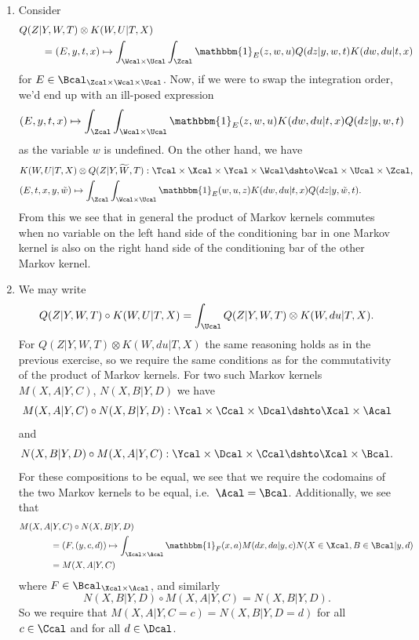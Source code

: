 \begin{enumerate}
\begin{ungradedsolution}
\begin{enumerate}
      \item Consider
      \begin{align*}
        Q(Z | & Y, W, T) \otimes K(W, U|T, X)                                                                                     \\
              & = (E, y, t, x) \mapsto \int_{\Wcal\times \Ucal}\int_{\Zcal} \mathbbm{1}_{E}(z, w, u)Q(dz | y,w, t)K(dw, du| t, x)
      \end{align*}
      for $E \in \Bcal_{\Zcal\times\Wcal\times\Ucal}$. Now, if we were to swap the integration order, we'd end up with an ill-posed expression
      \begin{align*}
        (E, y, t, x) \mapsto \int_{\Zcal}\int_{\Wcal\times \Ucal} \mathbbm{1}_{E}(z, w, u)K(dw, du| t, x) Q(dz | y,w, t)
      \end{align*}
      as the variable $w$ is undefined. On the other hand, we have
      \begin{align*}
         & K(W, U|T, X) \otimes Q(Z | Y, \widetilde{W}, T) : \Tcal \times \Xcal \times \Ycal \times \Wcal \dshto \Wcal \times \Ucal \times \Zcal, \\
         & (E, t, x, y, \tilde{w}) \mapsto \int_{\Zcal}\int_{\Wcal\times \Ucal} \mathbbm{1}_{E}(w, u, z)K(dw, du|t, x)Q(dz|y, \tilde{w}, t).
      \end{align*}
      From this we see that in general the product of Markov kernels commutes when no variable on the left hand side of the conditioning bar in one Markov kernel is also on the right hand side of the conditioning bar of the other Markov kernel.
      \item We may write
      $$Q(Z | Y, W, T) \circ K(W, U|T, X) = \int_\Ucal Q(Z | Y, W, T) \otimes K(W, du|T, X).$$ For $Q(Z | Y, W, T) \otimes K(W, du|T, X)$ the same reasoning holds as in the previous exercise, so we require the same conditions as for the commutativity of the product of Markov kernels. For two such Markov kernels $M(X, A| Y, C)$, $N(X, B| Y, D)$ we have
      $$M(X, A| Y, C) \circ N(X, B| Y, D): \Ycal \times \Ccal \times \Dcal \dshto \Xcal \times \Acal$$
      and
      $$N(X, B| Y, D) \circ M(X, A| Y, C): \Ycal \times \Dcal \times \Ccal \dshto \Xcal \times \Bcal.$$
      For these compositions to be equal, we see that we require the codomains of the two Markov kernels to be equal, i.e.\ $\Acal = \Bcal$. Additionally, we see that
      \begin{align*}
        M(X, A & | Y, C) \circ N(X, B| Y, D)                                                                                   \\
               & = (F, (y,c,d)) \mapsto \int_{\Xcal\times \Acal}\mathbbm{1}_{F}(x,a)M(dx, da|y, c)N(X\in\Xcal, B\in\Bcal|y, d) \\
               & = M(X, A|Y,C)
      \end{align*}
      where $F\in\Bcal_{\Xcal\times\Acal}$, and similarly
      $$N(X, B| Y, D) \circ M(X, A| Y, C) = N(X, B| Y, D).$$
      So we require that $M(X, A|Y, C=c) = N(X, B|Y, D=d)$ for all $c\in\Ccal$ and for all $d\in\Dcal$.
    \end{enumerate}
  \end{ungradedsolution}


\end{enumerate}
